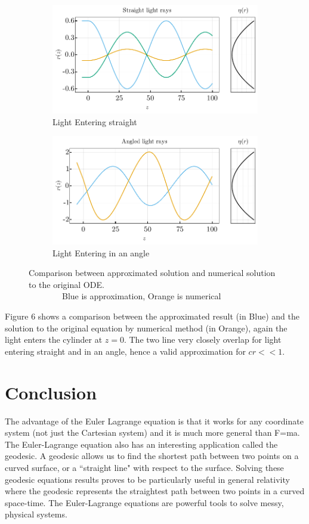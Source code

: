 \documentclass[%
 amsmath,amssymb,
aps,
 fleqn,
 notitlepage,
]{revtex4-2}
\begin{document}
\begin{figure}
    \begin{subfigure}{.5\textwidth}
      \includegraphics[width=.9\linewidth]{ray_comp.pdf}
      \caption{Light Entering straight}
    \end{subfigure}%
    \begin{subfigure}{.5\textwidth}
      \includegraphics[width=.9\linewidth]{ray_comp_angled.pdf}
      \caption{Light Entering in an angle}
    \end{subfigure}
    \caption{Comparison between approximated solution and numerical solution to the original ODE.\\$\qquad\qquad$Blue is approximation, Orange is numerical}
    \label{fig: ray_comp}
\end{figure}

Figure 6 shows a comparison between the approximated result (in Blue) and the solution to the original equation by numerical method (in Orange), again the light enters the cylinder at $z=0$. The two line very closely overlap for light entering straight and in an angle, hence a valid approximation for $cr << 1$.

\section{Conclusion}

The advantage of the Euler Lagrange equation is that it works for any coordinate system (not just the Cartesian system) and it is much more general than F=ma. The Euler-Lagrange equation also has an interesting application called the geodesic. A geodesic allows us to find the shortest path between two points on a curved surface, or a “straight line" with respect to the surface. Solving these geodesic equations results proves to be particularly useful in general relativity where the geodesic represents the straightest path between two points in a curved space-time. The Euler-Lagrange equations are powerful tools to solve messy, physical systems.
\end{document}
